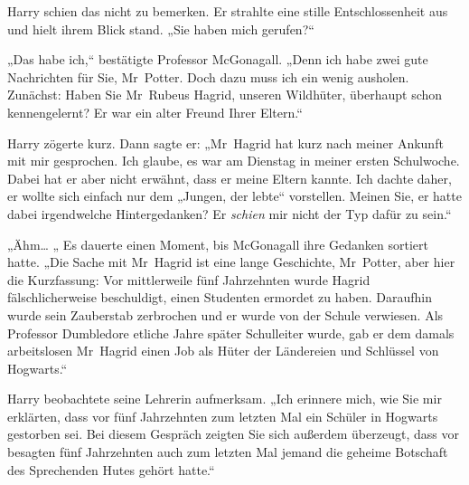 Harry schien das nicht zu bemerken. Er strahlte eine stille Entschlossenheit aus und hielt ihrem Blick stand. „Sie haben mich gerufen?“

„Das habe ich,“ bestätigte Professor McGonagall. „Denn ich habe zwei gute Nachrichten für Sie, Mr~Potter. Doch dazu muss ich ein wenig ausholen. Zunächst: Haben Sie Mr~Rubeus Hagrid, unseren Wildhüter, überhaupt schon kennengelernt? Er war ein alter Freund Ihrer Eltern.“

Harry zögerte kurz. Dann sagte er: „Mr~Hagrid hat kurz nach meiner Ankunft mit mir gesprochen. Ich glaube, es war am Dienstag in meiner ersten Schulwoche. Dabei hat er aber nicht erwähnt, dass er meine Eltern kannte. Ich dachte daher, er wollte sich einfach nur dem „Jungen, der lebte“ vorstellen. Meinen Sie, er hatte dabei irgendwelche Hintergedanken? Er \emph{schien} mir nicht der Typ dafür zu sein.“

„Ähm… „ Es dauerte einen Moment, bis McGonagall ihre Gedanken sortiert hatte. „Die Sache mit Mr~Hagrid ist eine lange Geschichte, Mr~Potter, aber hier die Kurzfassung: Vor mittlerweile fünf Jahrzehnten wurde Hagrid fälschlicherweise beschuldigt, einen Studenten ermordet zu haben. Daraufhin wurde sein Zauberstab zerbrochen und er wurde von der Schule verwiesen. Als Professor Dumbledore etliche Jahre später Schulleiter wurde, gab er dem damals arbeitslosen Mr~Hagrid einen Job als Hüter der Ländereien und Schlüssel von Hogwarts.“

Harry beobachtete seine Lehrerin aufmerksam. „Ich erinnere mich, wie Sie mir erklärten, dass vor fünf Jahrzehnten zum letzten Mal ein Schüler in Hogwarts gestorben sei. Bei diesem Gespräch zeigten Sie sich außerdem überzeugt, dass vor besagten fünf Jahrzehnten auch zum letzten Mal jemand die geheime Botschaft des Sprechenden Hutes gehört hatte.“

